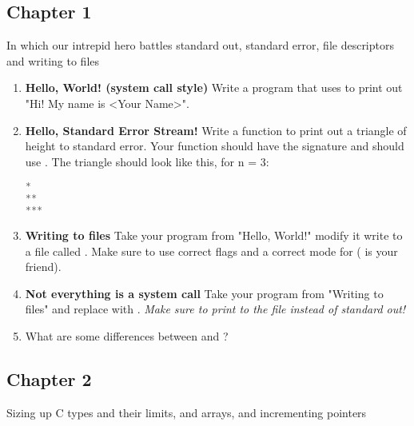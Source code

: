 \subsection{Chapter 1}

In which our intrepid hero battles standard out, standard error, file descriptors and writing to files

\begin{enumerate}
\item \textbf{Hello, World! (system call style)} Write a program that uses  to print out "Hi! My name is <Your Name>".
\item \textbf{Hello, Standard Error Stream!} Write a function to print out a triangle of height  to standard error.
Your function should have the signature  and should use .
The triangle should look like this, for n = 3:
\begin{lstlisting}[language=C]
*
**
***
\end{lstlisting}
\item \textbf{Writing to files} Take your program from "Hello, World!" modify it write to a file called . Make sure to use correct flags and a correct mode for  ( is your friend).
\item \textbf{Not everything is a system call} Take your program from "Writing to files" and replace  with . \textit{Make sure to print to the file instead of standard out!}
\item What are some differences between  and ?
\end{enumerate}

\subsection{Chapter 2}

Sizing up C types and their limits,  and  arrays, and incrementing pointers

